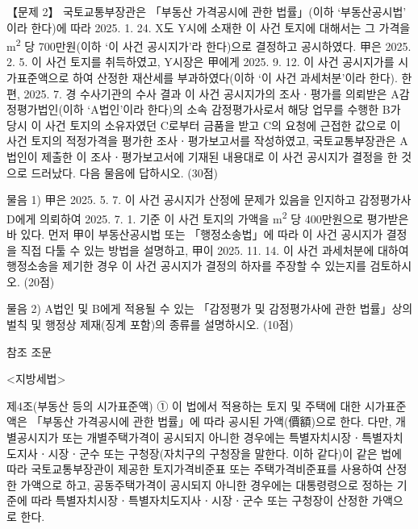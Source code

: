 \begin{longquestion}{【문제 2】}
국토교통부장관은 「부동산 가격공시에 관한 법률」(이하 ‘부동산공시법’ 이라 한다)에 따라 2025. 1. 24. X도 Y시에 소재한 이 사건 토지에 대해서는 그 가격을 m\textsuperscript{2} 당 700만원(이하 ‘이 사건 공시지가’라 한다)으로 결정하고 공시하였다. 甲은 2025. 2. 5. 이 사건 토지를 취득하였고, Y시장은 甲에게 2025. 9. 12. 이 사건 공시지가를 시가표준액으로 하여 산정한 재산세를 부과하였다(이하 ‘이 사건 과세처분’이라 한다). 한편, 2025. 7. 경 수사기관의 수사 결과 이 사건 공시지가의 조사ㆍ평가를 의뢰받은 A감정평가법인(이하 ‘A법인’이라 한다)의 소속 감정평가사로서 해당 업무를 수행한 B가 당시 이 사건 토지의 소유자였던 C로부터 금품을 받고 C의 요청에 근접한 값으로 이 사건 토지의 적정가격을 평가한 조사ㆍ평가보고서를 작성하였고, 국토교통부장관은 A법인이 제출한 이 조사ㆍ평가보고서에 기재된 내용대로 이 사건 공시지가 결정을 한 것으로 드러났다. 다음 물음에 답하시오. (30점) \par
\medskip\noindent 물음 1) 甲은 2025. 5. 7. 이 사건 공시지가 산정에 문제가 있음을 인지하고 감정평가사 D에게 의뢰하여 2025. 7. 1. 기준 이 사건 토지의 가액을 m\textsuperscript{2} 당 400만원으로 평가받은 바 있다. 먼저 甲이 부동산공시법 또는 「행정소송법」에 따라 이 사건 공시지가 결정을 직접 다툴 수 있는 방법을 설명하고, 甲이 2025. 11. 14. 이 사건 과세처분에 대하여 행정소송을 제기한 경우 이 사건 공시지가 결정의 하자를 주장할 수 있는지를 검토하시오. (20점) \par
\medskip\noindent 물음 2) A법인 및 B에게 적용될 수 있는 「감정평가 및 감정평가사에 관한 법률」상의 벌칙 및 행정상 제재(징계 포함)의 종류를 설명하시오. (10점) \par
\begin{framedtext}
참조 조문 \par
<지방세법> \par
제4조(부동산 등의 시가표준액) ① 이 법에서 적용하는 토지 및 주택에 대한 시가표준액은 「부동산 가격공시에 관한 법률」에 따라 공시된 가액(價額)으로 한다. 다만, 개별공시지가 또는 개별주택가격이 공시되지 아니한 경우에는 특별자치시장ㆍ특별자치도지사ㆍ시장ㆍ군수 또는 구청장(자치구의 구청장을 말한다. 이하 같다)이 같은 법에 따라 국토교통부장관이 제공한 토지가격비준표 또는 주택가격비준표를 사용하여 산정한 가액으로 하고, 공동주택가격이 공시되지 아니한 경우에는 대통령령으로 정하는 기준에 따라 특별자치시장ㆍ특별자치도지사ㆍ시장ㆍ군수 또는 구청장이 산정한 가액으로 한다. \par

\end{framedtext}
\end{longquestion}
